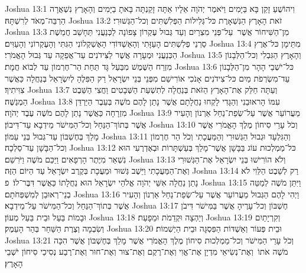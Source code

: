 Joshua 13:1	וִיהוֹשֻׁעַ זָקֵן בָּא בַּיָּמִים וַיֹּאמֶר יְהֹוָה אֵלָיו אַתָּה זָקַנְתָּה בָּאתָ בַיָּמִים וְהָאָרֶץ נִשְׁאֲרָה הַרְבֵּה־מְאֹד לְרִשְׁתָּהּ׃
Joshua 13:2	זֹאת הָאָרֶץ הַנִּשְׁאָרֶת כּל־גְּלִילוֹת הַפְּלִשְׁתִּים וְכל־הַגְּשׁוּרִי׃
Joshua 13:3	מִן־הַשִּׁיחוֹר אֲשֶׁר  עַל־פְּנֵי מִצְרַיִם וְעַד גְּבוּל עֶקְרוֹן צָפוֹנָה לַכְּנַעֲנִי תֵּחָשֵׁב חֲמֵשֶׁת  סַרְנֵי פְלִשְׁתִּים הָעַזָּתִי וְהָאַשְׁדּוֹדִי הָאֶשְׁקְלוֹנִי הַגִּתִּי וְהָעֶקְרוֹנִי וְהָעַוִּים׃
Joshua 13:4	מִתֵּימָן כּל־אֶרֶץ הַכְּנַעֲנִי וּמְעָרָה אֲשֶׁר לַצִּידֹנִים עַד־אֲפֵקָה עַד גְּבוּל הָאֱמֹרִי׃
Joshua 13:5	וְהָאָרֶץ הַגִּבְלִי וְכל־הַלְּבָנוֹן מִזְרַח הַשֶּׁמֶשׁ מִבַּעַל גָּד תַּחַת הַר־חֶרְמוֹן עַד לְבוֹא חֲמָת׃
Joshua 13:6	כּל־יֹשְׁבֵי הָהָר מִן־הַלְּבָנוֹן עַד־מִשְׂרְפֹת מַיִם כּל־צִידֹנִים אָנֹכִי אוֹרִישֵׁם מִפְּנֵי בְּנֵי יִשְׂרָאֵל רַק הַפִּלֶהָ לְיִשְׂרָאֵל בְּנַחֲלָה כַּאֲשֶׁר צִוִּיתִיךָ׃
Joshua 13:7	וְעַתָּה חַלֵּק אֶת־הָאָרֶץ הַזֹּאת בְּנַחֲלָה לְתִשְׁעַת הַשְּׁבָטִים וַחֲצִי הַשֵּׁבֶט הַמְנַשֶּׁה׃
Joshua 13:8	עִמּוֹ הָראוּבֵנִי וְהַגָּדִי לָקְחוּ נַחֲלָתָם אֲשֶׁר נָתַן לָהֶם מֹשֶׁה בְּעֵבֶר הַיַּרְדֵּן מִזְרָחָה כַּאֲשֶׁר נָתַן לָהֶם מֹשֶׁה עֶבֶד יְהֹוָה׃
Joshua 13:9	מֵעֲרוֹעֵר אֲשֶׁר עַל־שְׂפַת־נַחַל אַרְנוֹן וְהָעִיר אֲשֶׁר בְּתוֹךְ־הַנַּחַל וְכל־הַמִּישֹׁר מֵידְבָא עַד־דִּיבוֹן׃
Joshua 13:10	וְכֹל עָרֵי סִיחוֹן מֶלֶךְ הָאֱמֹרִי אֲשֶׁר מָלַךְ בְּחֶשְׁבּוֹן עַד־גְּבוּל בְּנֵי עַמּוֹן׃
Joshua 13:11	וְהַגִּלְעָד וּגְבוּל הַגְּשׁוּרִי וְהַמַּעֲכָתִי וְכֹל הַר חֶרְמוֹן וְכל־הַבָּשָׁן עַד־סַלְכָה׃
Joshua 13:12	כּל־מַמְלְכוּת עוֹג בַּבָּשָׁן אֲשֶׁר־מָלַךְ בְּעַשְׁתָּרוֹת וּבְאֶדְרֶעִי הוּא נִשְׁאַר מִיֶּתֶר הָרְפָאִים וַיַּכֵּם מֹשֶׁה וַיֹּרִשֵׁם׃
Joshua 13:13	וְלֹא הוֹרִישׁוּ בְּנֵי יִשְׂרָאֵל אֶת־הַגְּשׁוּרִי וְאֶת־הַמַּעֲכָתִי וַיֵּשֶׁב גְּשׁוּר וּמַעֲכָת בְּקֶרֶב יִשְׂרָאֵל עַד הַיּוֹם הַזֶּה׃
Joshua 13:14	רַק לְשֵׁבֶט הַלֵּוִי לֹא נָתַן נַחֲלָה אִשֵּׁי יְהֹוָה אֱלֹהֵי יִשְׂרָאֵל הוּא נַחֲלָתוֹ כַּאֲשֶׁר דִּבֶּר־לוֹ׃ {פ}
Joshua 13:15	וַיִּתֵּן מֹשֶׁה לְמַטֵּה בְנֵי־רְאוּבֵן לְמִשְׁפְּחֹתָם׃
Joshua 13:16	וַיְהִי לָהֶם הַגְּבוּל מֵעֲרוֹעֵר אֲשֶׁר עַל־שְׂפַת־נַחַל אַרְנוֹן וְהָעִיר אֲשֶׁר בְּתוֹךְ־הַנַּחַל וְכל־הַמִּישֹׁר עַל־מֵידְבָא׃
Joshua 13:17	חֶשְׁבּוֹן וְכל־עָרֶיהָ אֲשֶׁר בַּמִּישֹׁר דִּיבֹן וּבָמוֹת בַּעַל וּבֵית בַּעַל מְעוֹן׃
Joshua 13:18	וְיַהְצָה וּקְדֵמֹת וּמֵפָעַת׃
Joshua 13:19	וְקִרְיָתַיִם וְשִׂבְמָה וְצֶרֶת הַשַּׁחַר בְּהַר הָעֵמֶק׃
Joshua 13:20	וּבֵית פְּעוֹר וְאַשְׁדּוֹת הַפִּסְגָּה וּבֵית הַיְשִׁמוֹת׃
Joshua 13:21	וְכֹל עָרֵי הַמִּישֹׁר וְכל־מַמְלְכוּת סִיחוֹן מֶלֶךְ הָאֱמֹרִי אֲשֶׁר מָלַךְ בְּחֶשְׁבּוֹן אֲשֶׁר הִכָּה מֹשֶׁה אֹתוֹ  וְאֶת־נְשִׂיאֵי מִדְיָן אֶת־אֱוִי וְאֶת־רֶקֶם וְאֶת־צוּר וְאֶת־חוּר וְאֶת־רֶבַע נְסִיכֵי סִיחוֹן יֹשְׁבֵי הָאָרֶץ׃
